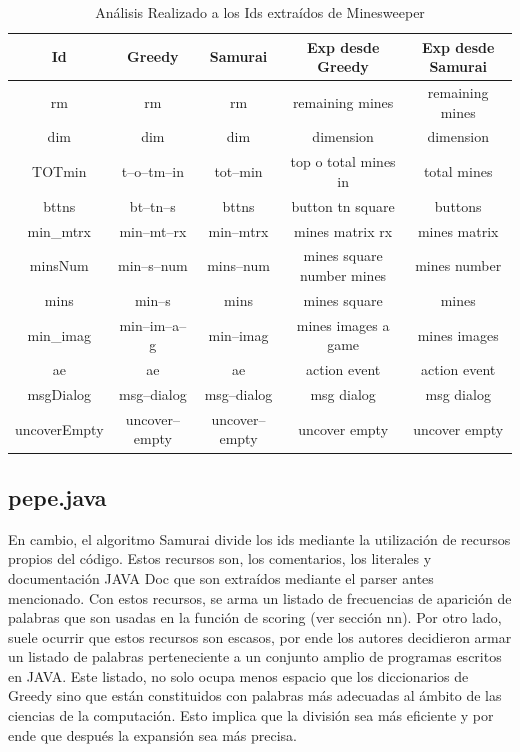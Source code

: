 \documentclass[a4paper,12pt]{report}
\begin{document}
\begin{table}

		\centering
   		\begin{tabular}{| c | c | c | c | c |}     
   		
       \hline
  	   \textsf{Id} & \textsf{Greedy} & \textsf{Samurai} & \textsf{Exp desde Greedy} & \textsf{Exp desde Samurai} \\ \hline
		rm&rm&rm&remaining mines&remaining mines \\ \hline
		dim&dim&dim&dimension&dimension \\ \hline
		TOTmin&t--o--tm--in&tot--min&top o  total mines in&total mines \\ \hline
		bttns&bt--tn--s&bttns&button tn  square&buttons \\ \hline
 		min\_mtrx&min--mt--rx&min--mtrx&mines matrix rx&mines matrix \\ \hline
		minsNum&min--s--num&mins--num&mines square number mines&mines number \\ \hline
		mins&min--s&mins&mines square&mines \\ \hline
		min\_imag&min--im--a--g&min--imag&mines images a game&mines images \\ \hline		
		ae&ae&ae&action event&action event \\ \hline
		msgDialog&msg--dialog&msg--dialog&msg dialog&msg dialog \\ \hline
		uncoverEmpty&uncover--empty&uncover--empty&uncover empty&uncover empty \\ \hline
  \end{tabular}
	 
   \caption{Análisis Realizado a los Ids extraídos de Minesweeper}
   \label{tabla5}
     
\end{table}

\clearpage %

\subsection{pepe.java}


En cambio, el algoritmo Samurai divide los ids mediante la utilización de recursos propios del código. Estos recursos son, los comentarios, los literales y documentación JAVA Doc que son extraídos mediante el parser antes mencionado. Con estos recursos, se arma un listado de frecuencias de aparición de palabras que son usadas en la función de scoring (ver sección nn). Por otro lado, suele ocurrir que estos recursos son escasos, por ende los autores decidieron armar un listado de palabras perteneciente a un conjunto amplio de programas escritos en JAVA. Este listado, no solo ocupa menos espacio que los diccionarios de Greedy sino que están constituidos con palabras más adecuadas al ámbito de las ciencias de la computación. Esto implica que la división sea más eficiente y por ende que después la expansión sea más precisa.
\end{document}
